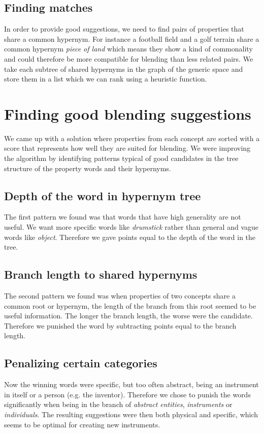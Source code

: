 \subsection{Finding matches}
In order to provide good suggestions, we need to find pairs of properties that share a common hypernym. For instance a football field and a golf terrain share a common hypernym \emph{piece of land} which means they show a kind of commonality and could therefore be more compatible for blending than less related pairs. We take each subtree of shared hypernyms in the graph of the generic space and store them in a list which we can rank using a heuristic function.


\section{Finding good blending suggestions}
We came up with a solution where properties from each concept are sorted with a score that represents how well they are suited for blending. We were improving the algorithm by identifying patterns typical of good candidates in the tree structure of the property words and their hypernyms.
\subsection{Depth of the word in hypernym tree}
The first pattern we found was that words that have high generality are not useful. We want more specific words like \emph{drumstick} rather than general and vague words like \emph{object}. Therefore we gave points equal to the depth of the word in the tree.
\subsection{Branch length to shared hypernyms}
The second pattern we found was when properties of two concepts share a common root or hypernym, the length of the branch from this root seemed to be useful information. The longer the branch length, the worse were the candidate. Therefore we punished the word by subtracting points equal to the branch length.
\subsection{Penalizing certain categories}
Now the winning words were specific, but too often abstract, being an instrument in itself or a person (e.g. the inventor). Therefore we chose to punish the words significantly when being in the branch of \emph{abstract entities}, \emph{instruments} or \emph{individuals}. The resulting suggestions were then both physical and specific, which seems to be optimal for creating new instruments.

